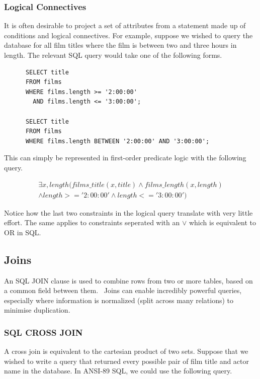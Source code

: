\documentclass[a4paper, 11pt]{article}
\begin{document}
    \subsubsection{Logical Connectives}

      It is often desirable to project a set of attributes from a statement
      made up of conditions and logical connectives. For example, suppose we
      wished to query the database for all film titles where the film is between 
      two and three hours in length. The relevant SQL query would take one of
      the following forms.

      \begin{verbatim}
      SELECT title
      FROM films
      WHERE films.length >= '2:00:00'
        AND films.length <= '3:00:00';

      SELECT title
      FROM films
      WHERE films.length BETWEEN '2:00:00' AND '3:00:00';
      \end{verbatim}

      This can simply be represented in first-order predicate logic with the
      following query.

      \begin{gather}
        \exists x, length(films\_title(x, title) \land films\_length(x,
        length)\\
        \land length >= '2:00:00' \land length <= '3:00:00')
      \end{gather}

      Notice how the last two constraints in the logical query translate
      with very little effort. The same applies to constraints seperated with
      an $\lor$ which is equivalent to OR in SQL.

  \subsection{Joins}
    \label{sec:joins}

    An SQL JOIN clause is used to combine rows from two or more tables, based
    on a common field between them.~\cite{w3JOINS} Joins can enable incredibly
    powerful queries, especially where information
    is normalized (split across many relations) to minimise duplication.

    \subsubsection{SQL CROSS JOIN}

      A cross join is equivalent to the cartesian product of two sets. Suppose
      that we wished to write a query that returned every possible pair of
      film title and actor name in the database. In ANSI-89 SQL, we could use 
      the following query.
\end{document}
